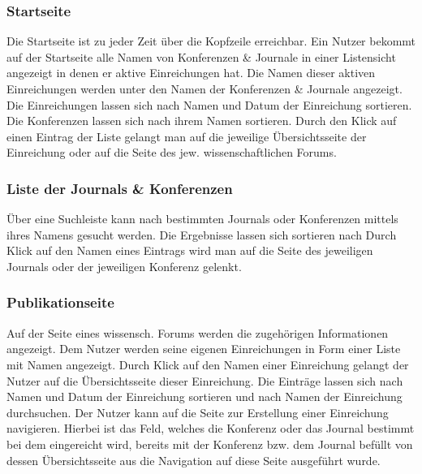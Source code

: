 \subsubsection{Startseite}
\begin{description}
    \XXitem{}{} Die Startseite ist zu jeder Zeit über die Kopfzeile erreichbar.
     Ein Nutzer bekommt auf der Startseite alle Namen von Konferenzen
    \& Journale in einer Listensicht angezeigt in denen er aktive Einreichungen hat.
    Die Namen dieser aktiven Einreichungen werden unter den Namen der Konferenzen \& Journale angezeigt.
     Die Einreichungen lassen sich nach Namen und Datum
    der Einreichung sortieren. Die Konferenzen lassen sich nach ihrem Namen sortieren.
    \XXitem{}{} Durch den Klick auf einen Eintrag der Liste gelangt man auf die jeweilige Übersichtsseite
    der Einreichung oder auf die Seite des jew. wissenschaftlichen Forums.
\end{description}

\subsubsection{Liste der Journals \& Konferenzen}
\begin{description}
     Über eine Suchleiste kann nach bestimmten Journals oder Konferenzen mittels
    ihres Namens gesucht werden.
     Die Ergebnisse lassen sich sortieren nach %
     Durch Klick auf den Namen eines Eintrags wird man auf die Seite des
    jeweiligen Journals oder der jeweiligen Konferenz gelenkt.
\end{description}

\subsubsection{Publikationseite}
\begin{description}
     Auf der Seite eines wissensch. Forums werden die zugehörigen Informationen
    angezeigt. %
     Dem Nutzer werden seine eigenen Einreichungen in Form einer Liste mit Namen angezeigt.
     Durch Klick auf den Namen einer Einreichung gelangt der Nutzer auf die Übersichtsseite
    dieser Einreichung.
     Die Einträge lassen sich nach Namen und Datum
    der Einreichung sortieren und nach Namen der Einreichung durchsuchen. %
    \XXitem{}{} Der Nutzer kann auf die Seite zur Erstellung einer Einreichung navigieren. Hierbei ist
    das Feld, welches die Konferenz oder das Journal bestimmt bei dem eingereicht wird, bereits mit
    der Konferenz bzw. dem Journal befüllt von dessen Übersichtsseite aus die Navigation auf diese
    Seite ausgeführt wurde.
\end{description}

